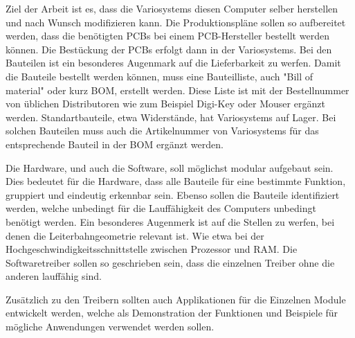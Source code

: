 Ziel der Arbeit ist es, dass die Variosystems diesen Computer selber herstellen und nach Wunsch modifizieren kann. Die Produktionspläne sollen so aufbereitet werden, dass die benötigten PCBs bei einem PCB-Hersteller bestellt werden können. Die Bestückung der PCBs erfolgt dann in der Variosystems. Bei den Bauteilen ist ein besonderes Augenmark auf die Lieferbarkeit zu werfen. Damit die Bauteile bestellt werden können, muss eine Bauteilliste, auch "Bill of material" oder kurz BOM, erstellt werden. Diese Liste ist mit der Bestellnummer von üblichen Distributoren wie zum Beispiel Digi-Key oder Mouser ergänzt werden. Standartbauteile, etwa Widerstände, hat Variosystems auf Lager. Bei solchen Bauteilen muss auch die Artikelnummer von Variosystems für das entsprechende Bauteil in der BOM ergänzt werden.

Die Hardware, und auch die Software, soll möglichst modular aufgebaut sein. Dies bedeutet für die Hardware, dass alle Bauteile für eine bestimmte Funktion, gruppiert und eindeutig erkennbar sein. Ebenso sollen die Bauteile identifiziert werden, welche unbedingt für die Lauffähigkeit des Computers unbedingt benötigt werden. Ein besonderes Augenmerk ist auf die Stellen zu werfen, bei denen die Leiterbahngeometrie relevant ist. Wie etwa bei der Hochgeschwindigkeitsschnittstelle zwischen Prozessor und RAM. Die Softwaretreiber sollen so geschrieben sein, dass die einzelnen Treiber ohne die anderen lauffähig sind. 

Zusätzlich zu den Treibern sollten auch Applikationen für die Einzelnen Module entwickelt werden, welche als Demonstration der Funktionen und Beispiele für mögliche Anwendungen verwendet werden sollen.
